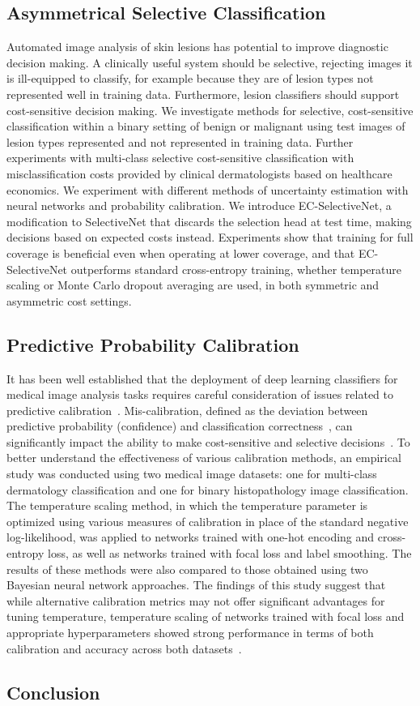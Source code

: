\subsection*{Asymmetrical Selective Classification}
Automated image analysis of skin lesions has potential to improve diagnostic decision making. A clinically useful system should be selective, rejecting images it is ill-equipped to classify, for example because they are of lesion types not represented well in training data. Furthermore, lesion classifiers should support cost-sensitive decision making. We investigate methods for selective, cost-sensitive classification within a binary setting of benign or malignant using test images of lesion types represented and not represented in training data. Further experiments with multi-class selective cost-sensitive classification with misclassification costs provided by clinical dermatologists based on healthcare economics. We experiment with different methods of uncertainty estimation with neural networks and probability calibration.
We introduce EC-SelectiveNet, a modification to SelectiveNet that discards the selection head at test time, making decisions based on expected costs instead. Experiments show that training for full coverage is beneficial even when operating at lower coverage, and that EC-SelectiveNet outperforms standard cross-entropy training, whether temperature scaling or Monte Carlo dropout averaging are used, in both symmetric and asymmetric cost settings.

\subsection*{Predictive Probability Calibration}
It has been well established that the deployment of deep learning classifiers for medical image analysis tasks requires careful consideration of issues related to predictive calibration~\cite{maron2019systematic}. Mis-calibration, defined as the deviation between predictive probability (confidence) and classification correctness~\cite{guo2017calibration}, can significantly impact the ability to make cost-sensitive and selective decisions~\cite{carse2021robust}. To better understand the effectiveness of various calibration methods, an empirical study was conducted using two medical image datasets: one for multi-class dermatology classification and one for binary histopathology image classification. The temperature scaling method, in which the temperature parameter is optimized using various measures of calibration in place of the standard negative log-likelihood, was applied to networks trained with one-hot encoding and cross-entropy loss, as well as networks trained with focal loss and label smoothing. The results of these methods were also compared to those obtained using two Bayesian neural network approaches. The findings of this study suggest that while alternative calibration metrics may not offer significant advantages for tuning temperature, temperature scaling of networks trained with focal loss and appropriate hyperparameters showed strong performance in terms of both calibration and accuracy across both datasets~\cite{carse2022calibration}.

\subsection*{Conclusion}
